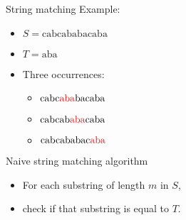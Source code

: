 \begin{frame}{String matching}
	Example:
	\begin{itemize}
		\item $S = \mathrm{cabcababacaba}$
		\item $T = \mathrm{aba}$
	\end{itemize}
    \begin{itemize}
        \item<2-> Three occurrences:
            \begin{itemize}
                \item<3-> $\mathrm{cabc{\color{red}{aba}}bacaba}$
                \item<4-> $\mathrm{cabcab{\color{red}{aba}}caba}$
                \item<5-> $\mathrm{cabcababac{\color{red}{aba}}}$
            \end{itemize}
    \end{itemize}
\end{frame}

\begin{frame}{Naive string matching algorithm}
	\begin{itemize}
	\item For each substring of length $m$ in $S$,
	\item check if that substring is equal to $T$.
	\end{itemize}
		
\end{frame}



